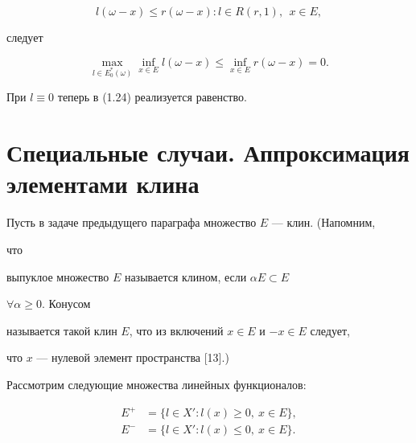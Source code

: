 \begin{pf}
\begin{equation} 


l(\omega-x)\le r(\omega-x):l\in R(r,1),\ \ x\in E, 


\end{equation} 


следует


\begin{equation} 


\max_{l\in E^*_0(\omega)}\inf_{x\in E} 


l(\omega-x)\le\inf_{x\in E}r(\omega-x)=0. 


\end{equation} 


При $l\equiv0$ теперь в (1.24) реализуется равенство. 


\end{pf} 


 


 


\section{Специальные случаи. Аппроксимация элементами клина} 


 


Пусть в задаче предыдущего параграфа множество $E$ --- клин. (Напомним, 


что 


выпуклое множество $E$ называется клином, если $\alpha E\subset E$\; 


$\forall\alpha\ge0$. Конусом 


называется такой клин $E$, что из включений $x\in E$ и $-x\in E$ следует, 


что $x$ --- нулевой элемент пространства [13].) 


Рассмотрим следующие множества линейных функционалов: 


\begin{equation} 


\begin{split} 


E^+&=\{l\in X':l(x)\ge0,\ x\in E\}, \\ 


E^-&=\{l\in X':l(x)\le0, \ x\in E\}. 


\end{split} 


\end{equation} 


